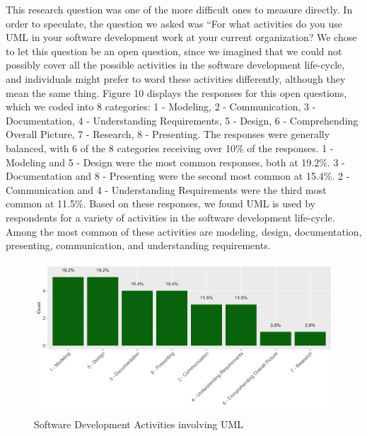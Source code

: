 \documentclass[letterpaper, 10 pt, conference]{ieeeconf}  %
\begin{document}
This research question was one of the more difficult ones to measure directly. In order to speculate, the question we asked was ``For what activities do you use UML in your software development work at your current organization? We chose to let this question be an open question, since we imagined that we could not possibly cover all the possible activities in the software development life-cycle, and individuals might prefer to word these activities differently, although they mean the same thing. Figure 10 displays the responses for this open questions, which we coded into 8 categories: 1 - Modeling, 2 - Communication, 3 - Documentation, 4 - Understanding Requirements, 5 - Design, 6 - Comprehending Overall Picture, 7 - Research, 8 - Presenting. The responses were generally balanced, with 6 of the 8 categories receiving over 10\% of the responses. 1 - Modeling and 5 - Design were the most common responses, both at 19.2\%. 3 - Documentation and 8 - Presenting were the second most common at 15.4\%. 2 - Communication and 4 - Understanding Requirements were the third most common at 11.5\%. Based on these responses, we found UML is used by respondents for a variety of activities in the software development life-cycle. Among the most common of these activities are modeling, design, documentation, presenting, communication, and understanding requirements. 

	\begin{figure}[!htb]
      \centering
      \label{RQ3Concl}
   \end{figure}

\begin{figure}[!htb]
      \centering
      \includegraphics[scale=0.25]{Plots/ActPlot}
      \caption{Software Development Activities involving UML}
      \label{ActUML}
   \end{figure}
   
\end{document}
